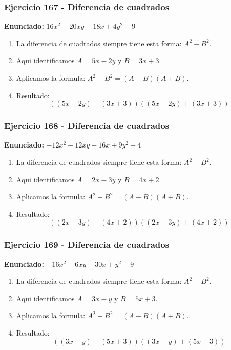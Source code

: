 \documentclass[11pt,a4paper]{article}
\begin{document}
\vspace{0.2cm}
\subsubsection*{Ejercicio 167 - Diferencia de cuadrados}
\textbf{Enunciado:} $ 16 x^{2} - 20 x y - 18 x + 4 y^{2} - 9 $\par
\begin{enumerate}[leftmargin=2em]
\item La diferencia de cuadrados siempre tiene esta forma: \(A^2-B^2\).
\item Aqui identificamos \(A=5 x - 2 y\) y \(B=3 x + 3\).
\item Aplicamos la formula: \(A^2-B^2=(A-B)(A+B)\).
\item Resultado: \[\boxed{\left(\left(5 x - 2 y\right)-\left(3 x + 3\right)\right)\left(\left(5 x - 2 y\right)+\left(3 x + 3\right)\right)}\]
\end{enumerate}

\vspace{0.2cm}
\subsubsection*{Ejercicio 168 - Diferencia de cuadrados}
\textbf{Enunciado:} $ - 12 x^{2} - 12 x y - 16 x + 9 y^{2} - 4 $\par
\begin{enumerate}[leftmargin=2em]
\item La diferencia de cuadrados siempre tiene esta forma: \(A^2-B^2\).
\item Aqui identificamos \(A=2 x - 3 y\) y \(B=4 x + 2\).
\item Aplicamos la formula: \(A^2-B^2=(A-B)(A+B)\).
\item Resultado: \[\boxed{\left(\left(2 x - 3 y\right)-\left(4 x + 2\right)\right)\left(\left(2 x - 3 y\right)+\left(4 x + 2\right)\right)}\]
\end{enumerate}

\vspace{0.2cm}
\subsubsection*{Ejercicio 169 - Diferencia de cuadrados}
\textbf{Enunciado:} $ - 16 x^{2} - 6 x y - 30 x + y^{2} - 9 $\par
\begin{enumerate}[leftmargin=2em]
\item La diferencia de cuadrados siempre tiene esta forma: \(A^2-B^2\).
\item Aqui identificamos \(A=3 x - y\) y \(B=5 x + 3\).
\item Aplicamos la formula: \(A^2-B^2=(A-B)(A+B)\).
\item Resultado: \[\boxed{\left(\left(3 x - y\right)-\left(5 x + 3\right)\right)\left(\left(3 x - y\right)+\left(5 x + 3\right)\right)}\]
\end{enumerate}
\end{document}
